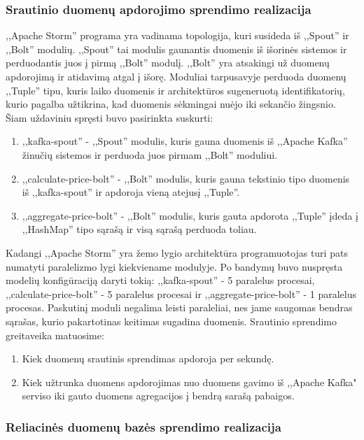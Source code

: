 \documentclass{VUMIFPSkursinis}
\begin{document}
\subsubsection{Srautinio duomenų apdorojimo sprendimo realizacija}

,,Apache Storm'' programa yra vadinama topologija, kuri susideda iš ,,Spout'' ir ,,Bolt'' modulių. ,,Spout'' tai modulis gaunantis duomenis
iš išorinės sistemos ir perduodantis juos į pirmą ,,Bolt'' modulį. ,,Bolt'' yra atsakingi už duomenų apdorojimą ir atidavimą atgal į išorę.
Moduliai tarpusavyje perduoda duomenų ,,Tuple'' tipu, kuris laiko duomenis ir architektūros sugeneruotą identifikatorių, 
kurio pagalba užtikrina, kad duomenis sėkmingai nuėjo iki sekančio žingsnio. 
Šiam uždaviniu spręsti buvo pasirinkta suskurti:
\begin{enumerate}
    \item ,,kafka-spout'' - ,,Spout'' modulis, kuris gauna duomenis iš ,,Apache Kafka'' žinučių sistemos ir perduoda juos pirmam ,,Bolt'' moduliui.
    \item ,,calculate-price-bolt'' - ,,Bolt'' modulis, kuris gauna tekstinio tipo duomenis iš ,,kafka-spout'' ir apdoroja vieną atejusį ,,Tuple''.
    \item ,,aggregate-price-bolt'' - ,,Bolt'' modulis, kuris gauta apdorota ,,Tuple'' įdeda į ,,HashMap'' tipo sąrašą ir visą sąrašą perduoda toliau.  
\end{enumerate}\par
Kadangi ,,Apache Storm'' yra žemo lygio architektūra programuotojas turi pats numatyti paralelizmo lygi kiekviename modulyje. 
Po bandymų buvo nuspręsta modelių konfigūraciją daryti tokią: ,,kafka-spout'' - 5 paralelus procesai, ,,calculate-price-bolt''
 - 5 paralelus procesai ir ,,aggregate-price-bolt'' - 1 paralelus procesas. Paskutinį moduli negalima leisti paraleliai, nes jame saugomas bendras sąrašas,
kurio pakartotinas keitimas sugadina duomenis. Srautinio sprendimo greitaveika matuosime:
\begin{enumerate}
    \item Kiek duomenų srautinis sprendimas apdoroja per sekundę.
    \item Kiek užtrunka duomens apdorojimas nuo duomens gavimo iš ,,Apache Kafka" serviso iki gauto duomens agregacijos į bendrą sarašą pabaigos.
\end{enumerate}

 \subsubsection{Reliacinės duomenų bazės sprendimo realizacija}
\end{document}
